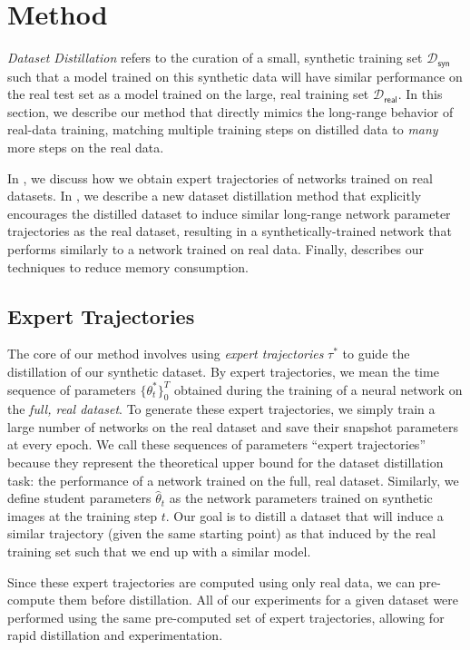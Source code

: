 \section{Method}
\emph{Dataset Distillation} refers to the curation of a small, synthetic training set $\mathcal{D}_\mathsf{syn}$ such that a model trained on this synthetic data will have similar performance on the real test set as a model trained on the large, real training set $\mathcal{D}_\mathsf{real}$. In this section, we describe our method that directly mimics the long-range behavior of real-data training, matching multiple training steps on distilled data to \textit{many} more steps on the real data.



In , we discuss how we obtain expert trajectories of networks trained on real datasets. In , we describe a new dataset distillation method that explicitly encourages the distilled dataset to induce similar long-range network parameter trajectories as the real dataset, resulting in a synthetically-trained network that performs similarly to a network trained on real data. Finally,  describes our techniques to reduce memory consumption.


\subsection{Expert Trajectories}
The core of our method involves using \emph{expert trajectories} $\tau^*$ to guide the distillation of our synthetic dataset. By expert trajectories, we mean the time sequence of parameters $\{\theta^*_t\}_0^T$ obtained during the training of a neural network on the \emph{full, real dataset}. To generate these expert trajectories, we simply train a large number of networks on the real dataset and save their snapshot parameters at every epoch. We call these sequences of parameters ``expert trajectories'' because they represent the theoretical upper bound for the dataset distillation task: the performance of a network trained on the full, real dataset. Similarly, we define student parameters $\hat{\theta}_t$ as the network parameters trained on synthetic images at the training step $t$. Our goal is to distill a dataset that will induce a similar trajectory (given the same starting point) as that induced by the real training set such that we end up with a similar model.

Since these expert trajectories are computed using only real data, we can pre-compute them before distillation. All of our experiments for a given dataset were performed using the same pre-computed set of expert trajectories, allowing for rapid distillation and experimentation.

